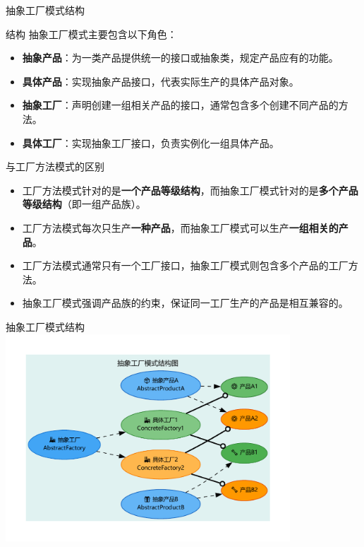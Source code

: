 \documentclass[UTF8,aspectratio=169]{beamer}
\begin{document}
\begin{frame}{抽象工厂模式结构}
    \begin{ytublock}{结构}
        抽象工厂模式主要包含以下角色：
        \begin{itemize}
            \item \textbf{抽象产品}：为一类产品提供统一的接口或抽象类，规定产品应有的功能。
            \item \textbf{具体产品}：实现抽象产品接口，代表实际生产的具体产品对象。
            \item \textbf{抽象工厂}：声明创建一组相关产品的接口，通常包含多个创建不同产品的方法。
            \item \textbf{具体工厂}：实现抽象工厂接口，负责实例化一组具体产品。
        \end{itemize}
    \end{ytublock}
    \begin{ytublock}{与工厂方法模式的区别}
        \begin{itemize}
            \item 工厂方法模式针对的是\textbf{一个产品等级结构}，而抽象工厂模式针对的是\textbf{多个产品等级结构}（即一组产品族）。
            \item 工厂方法模式每次只生产\textbf{一种产品}，而抽象工厂模式可以生产\textbf{一组相关的产品}。
            \item 工厂方法模式通常只有一个工厂接口，抽象工厂模式则包含多个产品的工厂方法。
            \item 抽象工厂模式强调产品族的约束，保证同一工厂生产的产品是相互兼容的。
        \end{itemize}
    \end{ytublock}
\end{frame}

\begin{frame}{抽象工厂模式结构}
        \includegraphics[width=0.8\textwidth]{images/abstract_factory_pattern.pdf}
\end{frame}
\end{document}
